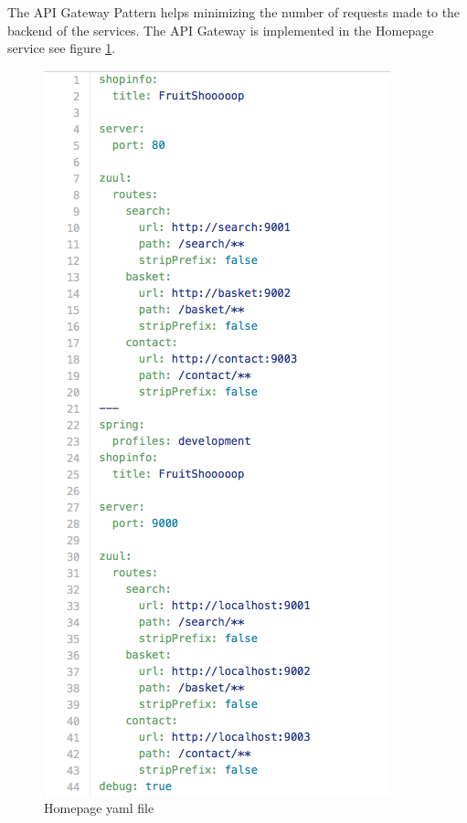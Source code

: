 The API Gateway Pattern helps minimizing the number of requests made to the backend of the services.
The API Gateway is implemented in the Homepage service see figure \ref{fig:homepage-yml}.  
\begin{figure}[bth]
	\includegraphics[width=1\linewidth]{gfx/homepage-yml}
	\caption[homepageyml]{Homepage yaml file} \label{fig:homepage-yml}
\end{figure}    

